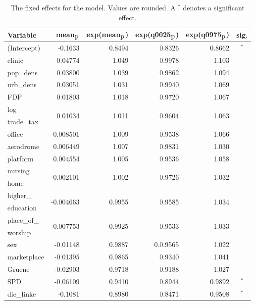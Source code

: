 \begin{table}[H]
\caption{The fixed effects for the model. Values are rounded. A $^*$ denotes a significant effect. \label{fixedAllGermany_temporal}}
\begin{tabular}{l r r r r c}
\toprule
\textbf{Variable}	& \textbf{mean$_{\hbox{p}}$}	& \textbf{exp(mean$_{\hbox{p}}$)} & \textbf{exp(q0025$_{\hbox{p}}$)} & \textbf{exp(q0975$_{\hbox{p}}$)} & \textbf{sig.}\\
\midrule
(Intercept) & -0.1633 & 0.8494 & 0.8326 & 0.8662 & $^*$\\
clinic & 0.04774 & 1.049 & 0.9978 & 1.103 \\
pop\_dens & 0.03800 & 1.039 & 0.9862 & 1.094 \\
urb\_dens & 0.03051 & 1.031 & 0.9940 & 1.069 \\
FDP & 0.01803 & 1.018 & 0.9720 & 1.067 \\
log & \multirow{2}{*}{0.01034} & \multirow{2}{*}{1.011} & \multirow{2}{*}{0.9604} & \multirow{2}{*}{1.063} & \multirow{2}{*}{}\\
trade\_tax \\
office & 0.008501 & 1.009 & 0.9538 & 1.066 \\
aerodrome & 0.006449 & 1.007 & 0.9831 & 1.030 \\
platform & 0.004554 & 1.005 & 0.9536 & 1.058 \\
nursing\_ & \multirow{2}{*}{0.002101} & \multirow{2}{*}{1.002} & \multirow{2}{*}{0.9726} & \multirow{2}{*}{1.032} \\
home\\
higher\_ & \multirow{2}{*}{-0.004663} & \multirow{2}{*}{0.9955} & \multirow{2}{*}{0.9585} & \multirow{2}{*}{1.034} \\
education\\
place\_of\_ & \multirow{2}{*}{-0.007753} & \multirow{2}{*}{0.9925} & \multirow{2}{*}{0.9533} & \multirow{2}{*}{1.033} \\
worship\\
sex & -0.01148 & 0.9887 & 0.0.9565 & 1.022 \\
marketplace & -0.01395 & 0.9865 & 0.9340 & 1.041 \\
Gruene & -0.02903 & 0.9718 & 0.9188 & 1.027\\
SPD & -0.06109 & 0.9410 & 0.8944 & 0.9892 & $^*$ \\
die\_linke & -0.1081 & 0.8980 & 0.8471 & 0.9508& $^*$ \\
\bottomrule
\end{tabular}
\end{table}
